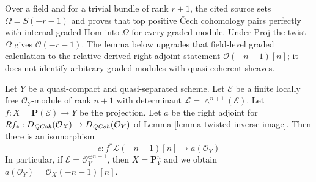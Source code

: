 \begin{lemma}
\label{lemma-upper-shriek-P1}
\begin{reference}
\cite[Chapter III, \S 4, no. 71, Proposition 2 and proof,
pp. 264--265]{FAC}
\end{reference}
\begin{history}
Over a field and for a trivial bundle of rank $r+1$, the cited source sets
$\Omega=S(-r-1)$ and proves that top positive {\v C}ech cohomology pairs
perfectly with internal graded Hom into $\Omega$ for every graded module.
Under Proj the twist $\Omega$ gives $\mathcal{O}(-r-1)$. The lemma below
upgrades that field-level graded calculation to the relative derived
right-adjoint statement $\mathcal{O}(-n-1)[n]$; it does not identify
arbitrary graded modules with quasi-coherent sheaves.
\end{history}
Let $Y$ be a quasi-compact and quasi-separated scheme.
Let $\mathcal{E}$ be a finite locally
free $\mathcal{O}_Y$-module of rank $n + 1$ with determinant
$\mathcal{L} = \wedge^{n + 1}(\mathcal{E})$.
Let $f : X = \mathbf{P}(\mathcal{E}) \to Y$ be the projection.
Let $a$ be the right adjoint for
$Rf_* : D_{\mathit{QCoh}}(\mathcal{O}_X) \to D_{\mathit{QCoh}}(\mathcal{O}_Y)$ of
Lemma \ref{lemma-twisted-inverse-image}.
Then there is an isomorphism
$$
c : f^*\mathcal{L}(-n - 1)[n] \longrightarrow a(\mathcal{O}_Y)
$$
In particular, if $\mathcal{E} = \mathcal{O}_Y^{\oplus n + 1}$, then
$X = \mathbf{P}^n_Y$ and we obtain
$a(\mathcal{O}_Y) = \mathcal{O}_X(-n - 1)[n]$.
\end{lemma}

